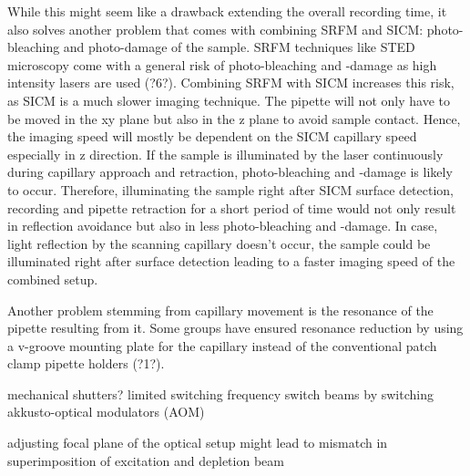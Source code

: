 While this might seem like a drawback extending the overall recording time, it also solves another problem that comes with combining SRFM and SICM: photo-bleaching and photo-damage of the sample. SRFM techniques like STED microscopy come with a general risk of photo-bleaching and -damage as high intensity lasers are used (?6?). Combining SRFM with SICM increases this risk, as SICM is a much slower imaging technique. The pipette will not only have to be moved in the xy plane but also in the z plane to avoid sample contact. Hence, the imaging speed will mostly be dependent on the SICM capillary speed especially in z direction. If the sample is illuminated by the laser continuously during capillary approach and retraction, photo-bleaching and -damage is likely to occur. Therefore, illuminating the sample right after SICM surface detection, recording and pipette retraction for a short period of time would not only result in reflection avoidance but also in less photo-bleaching and -damage. In case, light reflection by the scanning capillary doesn't occur, the sample could be illuminated right after surface detection leading to a faster imaging speed of the combined setup.

Another problem stemming from capillary movement is the resonance of the pipette resulting from it. Some groups have ensured resonance reduction by using a v-groove mounting plate for the capillary instead of the conventional patch clamp pipette holders (?1?).

 	
	 		mechanical shutters? limited switching frequency
	 			switch beams by switching akkusto-optical modulators (AOM)

adjusting focal plane of the optical setup might lead to mismatch in superimposition of excitation and depletion beam


